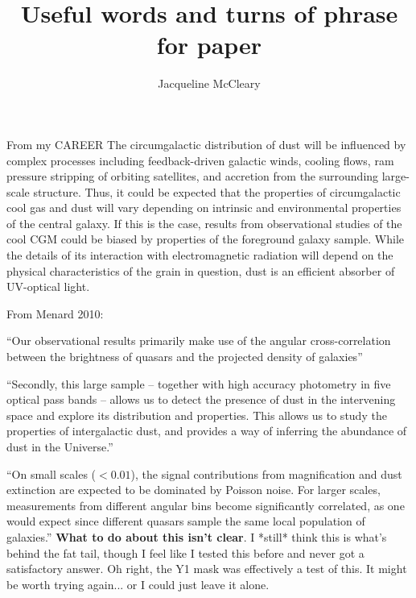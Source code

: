 \documentclass[11pt, oneside]{article}   	%
\title{Useful words and turns of phrase for paper}
\author{Jacqueline McCleary}
\begin{document}
\maketitle

From my CAREER
The circumgalactic distribution of dust will be influenced by complex processes including feedback-driven galactic winds, cooling flows, ram pressure stripping of orbiting satellites, and accretion from the surrounding large-scale structure. Thus, it could be expected that the properties of circumgalactic cool gas and dust will vary depending on intrinsic and environmental properties of the central galaxy. If this is the case, results from observational studies of the cool CGM could be biased by properties of the foreground galaxy sample.
\noindent
While the details of its interaction with electromagnetic radiation will depend on the physical characteristics of the grain in question, 
dust is an efficient absorber of UV-optical light. %


From Menard 2010: 

``Our observational results primarily make use of the angular cross-correlation between the brightness of quasars and the projected density of galaxies'' 

``Secondly, this large sample – together with high accuracy photometry in five optical pass bands – allows us to detect the presence of dust in the intervening space and explore its distribution and properties. This allows us to study the properties of intergalactic dust, and provides a way of inferring the abundance of dust in the Universe.''

``On small scales ($<0.01$), the signal contributions from magnification and dust extinction are expected to be dominated by Poisson noise. For larger scales, measurements from different angular bins become significantly correlated, as one would expect since different quasars sample the same local population of galaxies.'' \textbf{What to do about this isn't clear}. I *still* think this is what's behind the fat tail, though I feel like I tested this before and never got a satisfactory answer. Oh right, the Y1 mask was effectively a test of this. It might be worth trying again... or I could just leave it alone. 
\end{document}
